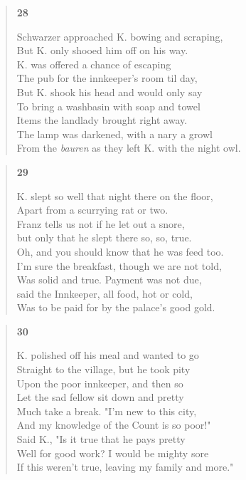 \documentclass{article}
\begin{document}
\newpage

\begin{verse}
  \begin{center}
    \textbf{28} \\
  \end{center}
  Schwarzer approached K. bowing and scraping, \\
  But K. only shooed him off on his way. \\
  K. was offered a chance of escaping \\
  The pub for the innkeeper's room til day, \\
  But K. shook his head and would only say \\
  To bring a washbasin with soap and towel \\
  Items the landlady brought right away. \\
  The lamp was darkened, with a nary a growl \\
  From the \textit{bauren} as they left K. with the night owl.
\end{verse}

\begin{verse}
  \begin{center}
    \textbf{29} \\
  \end{center}
  K. slept so well that night there on the floor, \\
  Apart from a scurrying rat or two.\\
  Franz tells us not if he let out a snore, \\
  but only that he slept there so, so, true. \\
  Oh, and you should know that he was feed too. \\
  I'm sure the breakfast, though we are not told, \\
  Was solid and true. Payment was not due, \\
  said the Innkeeper, all food, hot or cold, \\
  Was to be paid for by the palace's good gold.
\end{verse}

\begin{verse}
  \begin{center}
    \textbf{30} \\
  \end{center}
  K. polished off his meal and wanted to go \\
  Straight to the village, but he took pity \\
  Upon the poor innkeeper, and then so \\
  Let the sad fellow sit down and pretty \\
  Much take a break. "I'm new to this city, \\
  And my knowledge of the Count is so poor!" \\
  Said K., "Is it true that he pays pretty \\
  Well for good work? I would be mighty sore \\
  If this weren't true, leaving my family and more."
\end{verse}
\end{document}
